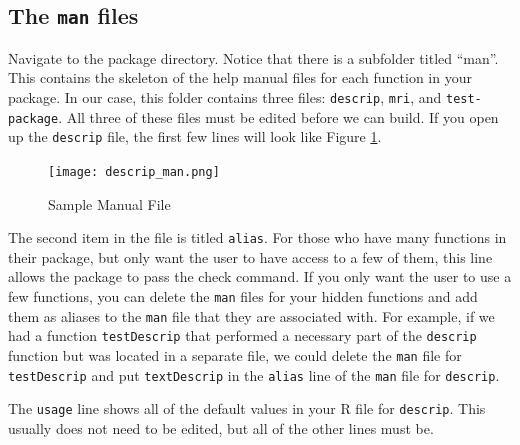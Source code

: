 \documentclass{article}
\begin{document}
\subsection{The \texttt{man} files}
Navigate to the package directory. Notice that there is a subfolder titled ``man''. This contains the skeleton of the help manual files for each function in your package. In our case, this folder contains three files: \texttt{descrip}, \texttt{mri}, and \texttt{test-package}. All three of these files must be edited before we can build. If you open up the \texttt{descrip} file, the first few lines will look like Figure \ref{descripman}.
\begin{figure}[h]
\caption{Sample Manual File}
\texttt{[image: descrip\_man.png]}
\label{descripman}
\end{figure}
The second item in the file is titled \texttt{alias}. For those who have many functions in their package, but only want the user to have access to a few of them, this line allows the package to pass the check command. If you only want the user to use a few functions, you can delete the \texttt{man} files for your hidden functions and add them as aliases to the \texttt{man} file that they are associated with. For example, if we had a function \texttt{testDescrip} that performed a necessary part of the \texttt{descrip} function but was located in a separate file, we could delete the \texttt{man} file for \texttt{testDescrip} and put \texttt{textDescrip} in the \texttt{alias} line of the \texttt{man} file for \texttt{descrip}.

The \texttt{usage} line shows all of the default values in your R file for \texttt{descrip}. This usually does not need to be edited, but all of the other lines must be. 
\end{document}
